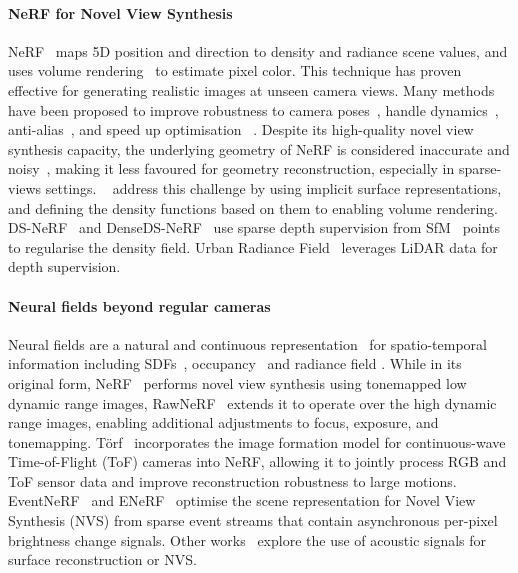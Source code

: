 \paragraph{NeRF for Novel View Synthesis}
NeRF~\cite{mildenhall2020nerf} maps 5D position and direction to density and radiance scene values, and uses volume rendering~\cite{max1995optical,max2005local} to estimate pixel color. This technique has proven effective for generating realistic images at unseen camera views. Many methods have been proposed to improve robustness to camera poses~\cite{lin2021barf,chng2022garf}, handle dynamics~\cite{ost2021neural,pumarola2021d}, anti-alias~\cite{zhang2020nerf++,barron2021mip,barron2022mip}, and speed up optimisation~\cite{liu2020neural,yu2021plenoxels,mueller2022instant} \etc. Despite its high-quality novel view synthesis capacity, the underlying geometry of NeRF is considered inaccurate and noisy~\cite{oechsle2021unisurf}, making it less favoured for geometry reconstruction, especially in sparse-views settings. ~\cite{oechsle2021unisurf,yariv2021volume,wang2021neus} address this challenge by using implicit surface representations, and defining the density functions based on them to enabling volume rendering. DS-NeRF~\cite{deng2021depth} and DenseDS-NeRF~\cite{roessle2021dense} use sparse depth supervision from SfM~\cite{schoenberger2016sfm} points to regularise the density field. Urban Radiance Field~\cite{rematas2021urban} leverages LiDAR data for depth supervision. %

\paragraph{Neural fields beyond regular cameras}
Neural fields are a natural and continuous representation~\cite{xie2022neural} for spatio-temporal information including SDFs~\cite{park2019deepsdf}, occupancy~\cite{mescheder2019occupancy} and radiance field \cite{mildenhall2020nerf} \etc. 
While in its original form, NeRF~\cite{mildenhall2020nerf} performs novel view synthesis using tonemapped low dynamic range images, RawNeRF~\cite{mildenhall2022nerf} extends it to operate over the high dynamic range images, enabling additional adjustments to focus, exposure, and tonemapping. T{\"o}rf~\cite{attal2021torf} incorporates the image formation model for continuous-wave Time-of-Flight (ToF) cameras into NeRF, allowing it to jointly process RGB and ToF sensor data and improve reconstruction robustness to large motions. EventNeRF~\cite{rudnev2022eventnerf} and ENeRF~\cite{klenk2022nerf} optimise the scene representation for Novel View Synthesis (NVS) from sparse event streams that contain asynchronous per-pixel brightness change signals. Other works~\cite{qadri2022neural,luo2022learning} explore the use of acoustic signals for surface reconstruction or NVS. 